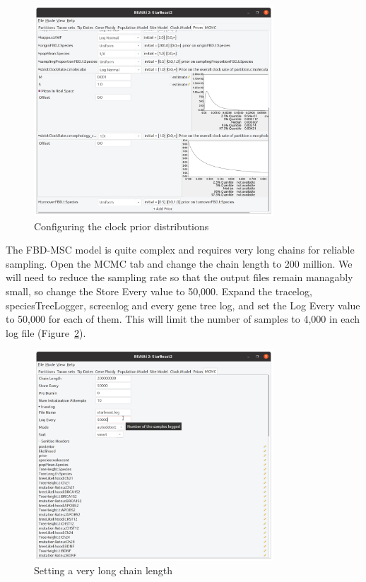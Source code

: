 \documentclass[12pt]{article}
\begin{document}
\begin{figure}[htb!]
\centering
\includegraphics[width=0.8\textwidth]{figures/clockPriors.png}
\caption
{Configuring the clock prior distributions}
\label{fig:clockPriors}
\end{figure}

\newpage{}

The FBD-MSC model is quite complex and requires very long chains for
reliable sampling. Open the MCMC tab and change the chain length to 200
million. We will need to reduce the sampling rate so that the output files remain
managably small, so change the Store Every value to 50,000. Expand the
tracelog, speciesTreeLogger, screenlog and every gene tree log, and set the
Log Every value to 50,000 for each of them. This will limit the number of
samples to 4,000 in each log file (Figure~\ref{fig:fbdChainLength}).

\begin{figure}[htb!]
\centering
\includegraphics[width=0.8\textwidth]{figures/fbdChainLength.png}
\caption
{Setting a very long chain length}
\label{fig:fbdChainLength}
\end{figure}
\end{document}
